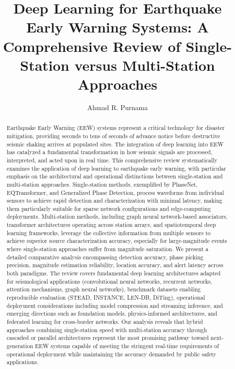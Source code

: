 \documentclass[review,authoryear]{elsarticle}
\begin{document}
\begin{frontmatter}

\title{Deep Learning for Earthquake Early Warning Systems: A Comprehensive Review of Single-Station versus Multi-Station Approaches}

\author[inst1,inst2]{Ahmad R. Purnama}



\begin{abstract}
Earthquake Early Warning (EEW) systems represent a critical technology for disaster mitigation, providing seconds to tens of seconds of advance notice before destructive seismic shaking arrives at populated sites. The integration of deep learning into EEW has catalyzed a fundamental transformation in how seismic signals are processed, interpreted, and acted upon in real time. This comprehensive review systematically examines the application of deep learning to earthquake early warning, with particular emphasis on the architectural and operational distinctions between single-station and multi-station approaches. Single-station methods, exemplified by PhaseNet, EQTransformer, and Generalized Phase Detection, process waveforms from individual sensors to achieve rapid detection and characterization with minimal latency, making them particularly suitable for sparse network configurations and edge-computing deployments. Multi-station methods, including graph neural network-based associators, transformer architectures operating across station arrays, and spatiotemporal deep learning frameworks, leverage the collective information from multiple sensors to achieve superior source characterization accuracy, especially for large-magnitude events where single-station approaches suffer from magnitude saturation. We present a detailed comparative analysis encompassing detection accuracy, phase picking precision, magnitude estimation reliability, location accuracy, and alert latency across both paradigms. The review covers fundamental deep learning architectures adapted for seismological applications (convolutional neural networks, recurrent networks, attention mechanisms, graph neural networks), benchmark datasets enabling reproducible evaluation (STEAD, INSTANCE, LEN-DB, DiTing), operational deployment considerations including model compression and streaming inference, and emerging directions such as foundation models, physics-informed architectures, and federated learning for cross-border networks. Our analysis reveals that hybrid approaches combining single-station speed with multi-station accuracy through cascaded or parallel architectures represent the most promising pathway toward next-generation EEW systems capable of meeting the stringent real-time requirements of operational deployment while maintaining the accuracy demanded by public safety applications.

\end{abstract}
\end{frontmatter}
\end{document}
